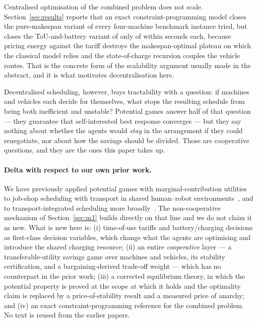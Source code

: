 \documentclass[preprint, 3p, review, 12pt]{elsarticle}
\theoremstyle{definition}
\begin{document}
Centralised optimisation of the combined problem does not scale. Section~\ref{sec:results}
reports that an exact constraint-programming model closes the pure-makespan variant of every
four-machine benchmark instance tried, but closes the ToU-and-battery variant of only
 of  within  seconds each,
because pricing energy against the tariff destroys the makespan-optimal plateau on which the
classical model relies and the state-of-charge recursion couples the vehicle routes. That is the concrete form of the scalability argument usually made in the abstract,
and it is what motivates decentralisation here.

Decentralised scheduling, however, buys tractability with a question: if machines and
vehicles each decide for themselves, what stops the resulting schedule from being both
inefficient and unstable? Potential games answer half of that question --- they guarantee
that self-interested best response converges --- but they say nothing about whether the
agents would \emph{stay} in the arrangement if they could renegotiate, nor about how the
savings should be divided. Those are cooperative questions, and they are the ones this paper
takes up.

\paragraph{Delta with respect to our own prior work.}
We have previously applied potential games with marginal-contribution utilities to job-shop
scheduling with transport in shared human--robot environments~\citep{SANOGO2025111366}, and
to transport-integrated scheduling more broadly~\citep{SANOGO2025103060, SANOGO2023209}. The
non-cooperative mechanism of Section~\ref{sec:m1} builds directly on that line and we do not
claim it as new. What is new here is: (i) time-of-use tariffs and battery/charging decisions
as first-class decision variables, which change what the agents are optimising and introduce
the shared charging resource; (ii) an entire \emph{cooperative} layer --- a
transferable-utility savings game over machines and vehicles, its stability certification,
and a bargaining-derived trade-off weight --- which has no counterpart in the prior work;
(iii) a corrected equilibrium theory, in which the potential property is proved at the scope
at which it holds and the optimality claim is replaced by a price-of-stability result and a
measured price of anarchy; and (iv) an exact constraint-programming reference for the
combined problem. No text is reused from the earlier papers.
\end{document}
